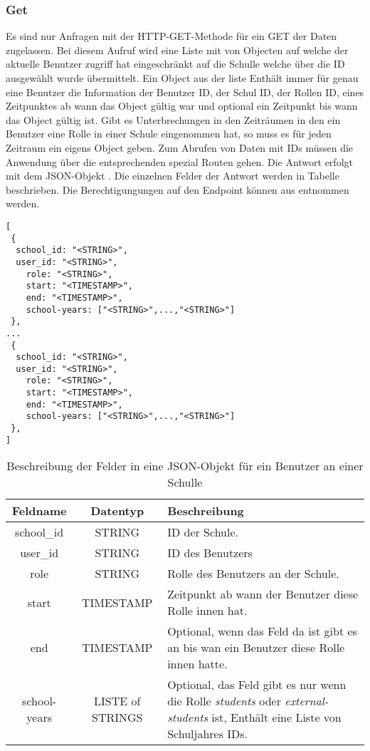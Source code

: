 \subsubsection{Get}
\label{sec:rest:api:school:users:id:get}
Es sind nur Anfragen mit der HTTP-GET-Methode für ein GET der Daten zugelassen.
Bei diesem Aufruf wird eine Liste mit von Objecten auf welche der aktuelle Benutzer zugriff hat eingeschränkt auf die Schulle welche über die ID ausgewählt wurde übermittelt.
Ein Object aus der liste Enthält immer für genau eine Benutzer die Information der Benutzer ID, der Schul ID, der Rollen ID, eines Zeitpunktes ab wann das Object gültig war und optional ein Zeitpunkt bis wann das Object gültig ist.
Gibt es Unterbrechungen in den Zeiträumen in den ein Benutzer eine Rolle in einer Schule eingenommen hat, so muss es für jeden Zeitraum ein eigens Object geben.
Zum Abrufen von Daten mit IDs müssen die Anwendung über die entsprechenden spezial Routen gehen.
Die Antwort erfolgt mit dem JSON-Objekt . Die einzelnen Felder der Antwort werden in Tabelle  beschrieben.
Die Berechtigungungen auf den Endpoint können aus  entnommen werden.


\begin{lstlisting}[caption={JSON-Antwort für einen GET-Aufruf der Route /api/school/users/\$id},label={lst:code:rest:api:school:users:id:get:ret},frame=tlrb]
[
 {
  school_id: "<STRING>",
  user_id: "<STRING>",
	role: "<STRING>",
	start: "<TIMESTAMP>",
	end: "<TIMESTAMP>",
	school-years: ["<STRING>",...,"<STRING>"]
 },
...
 {
  school_id: "<STRING>",
  user_id: "<STRING>",
	role: "<STRING>",
	start: "<TIMESTAMP>",
	end: "<TIMESTAMP>",
	school-years: ["<STRING>",...,"<STRING>"]
 },
]
\end{lstlisting}

\begin{table}[htb]
	\begin{tabularx}{\textwidth}{|c|c|X|}
		\hline
			\textbf{Feldname} & \textbf{Datentyp} & \textbf{Beschreibung} \\ \hline
			school\_id & STRING & ID der Schule. \\ \hline
			user\_id & STRING & ID des Benutzers \\ \hline
			role & STRING & Rolle des Benutzers an der Schule. \\ \hline
			start & TIMESTAMP & Zeitpunkt ab wann der Benutzer diese Rolle innen hat. \\ \hline
			end & TIMESTAMP & Optional, wenn das Feld da ist gibt es an bis wan ein Benutzer diese Rolle innen hatte. \\ \hline
			school-years & LISTE of STRINGS & Optional, das Feld gibt es nur wenn die Rolle \textit{students} oder \textit{external-students} ist, Enthält eine Liste von Schuljahres IDs. \\ \hline 
	\end{tabularx}

		\caption{Beschreibung der Felder in eine JSON-Objekt für ein Benutzer an einer Schulle}
		\label{tab:rest:api:school:users:id:get:ret:json}
\end{table}

